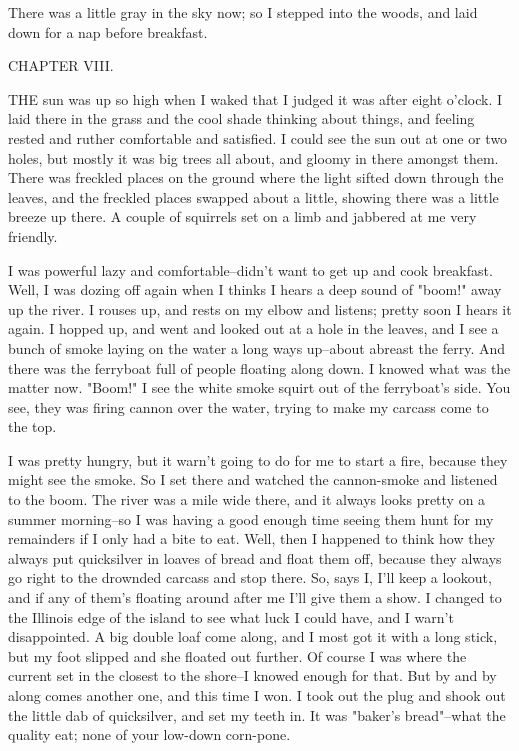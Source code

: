 There was a little gray in the sky now; so I stepped into the woods, and
laid down for a nap before breakfast.




CHAPTER VIII.

THE sun was up so high when I waked that I judged it was after eight
o'clock.  I laid there in the grass and the cool shade thinking about
things, and feeling rested and ruther comfortable and satisfied.  I could
see the sun out at one or two holes, but mostly it was big trees all
about, and gloomy in there amongst them.  There was freckled places on
the ground where the light sifted down through the leaves, and the
freckled places swapped about a little, showing there was a little breeze
up there.  A couple of squirrels set on a limb and jabbered at me very
friendly.

I was powerful lazy and comfortable--didn't want to get up and cook
breakfast.  Well, I was dozing off again when I thinks I hears a deep
sound of "boom!" away up the river.  I rouses up, and rests on my elbow
and listens; pretty soon I hears it again.  I hopped up, and went and
looked out at a hole in the leaves, and I see a bunch of smoke laying on
the water a long ways up--about abreast the ferry.  And there was the
ferryboat full of people floating along down.  I knowed what was the
matter now.  "Boom!" I see the white smoke squirt out of the ferryboat's
side.  You see, they was firing cannon over the water, trying to make my
carcass come to the top.

I was pretty hungry, but it warn't going to do for me to start a fire,
because they might see the smoke.  So I set there and watched the
cannon-smoke and listened to the boom.  The river was a mile wide there,
and it always looks pretty on a summer morning--so I was having a good
enough time seeing them hunt for my remainders if I only had a bite to
eat. Well, then I happened to think how they always put quicksilver in
loaves of bread and float them off, because they always go right to the
drownded carcass and stop there.  So, says I, I'll keep a lookout, and if
any of them's floating around after me I'll give them a show.  I changed
to the Illinois edge of the island to see what luck I could have, and I
warn't disappointed.  A big double loaf come along, and I most got it
with a long stick, but my foot slipped and she floated out further.  Of
course I was where the current set in the closest to the shore--I knowed
enough for that.  But by and by along comes another one, and this time I
won.  I took out the plug and shook out the little dab of quicksilver,
and set my teeth in.  It was "baker's bread"--what the quality eat; none
of your low-down corn-pone.

